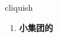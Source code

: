 
\begin{frame}
{\huge cliquish}
\begin{center}
\begin{enumerate}\Large
  \item \textbf{小集团的}
\end{enumerate}
\end{center}
\end{frame}
